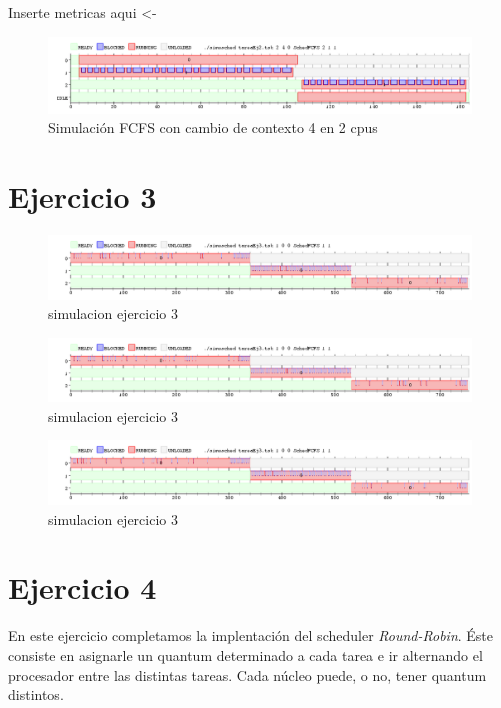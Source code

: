\documentclass[11pt]{article}
\begin{document}
  Inserte metricas aqui <-

  \begin{figure}[H]
    \includegraphics[scale=0.5]{Ejercicio2_2cpu}
    \caption{Simulación FCFS con cambio de contexto 4 en 2 cpus}
  \end{figure}

\section{Ejercicio 3}

  \begin{figure}[H]
    \includegraphics[scale=0.5]{Ejercicio3_1}
    \caption{simulacion ejercicio 3}
  \end{figure}

  \begin{figure}[H]
    \includegraphics[scale=0.5]{Ejercicio3_2}
    \caption{simulacion ejercicio 3}
  \end{figure}

  \begin{figure}[H]
    \includegraphics[scale=0.5]{Ejercicio3_3}
    \caption{simulacion ejercicio 3}
  \end{figure}
\newpage 

\section{Ejercicio 4}

En este ejercicio completamos la implentación del scheduler \textit{Round-Robin}. Éste consiste en asignarle un quantum determinado a cada tarea e ir alternando el procesador entre las distintas tareas. Cada núcleo puede, o no, tener quantum distintos. 
\end{document}
